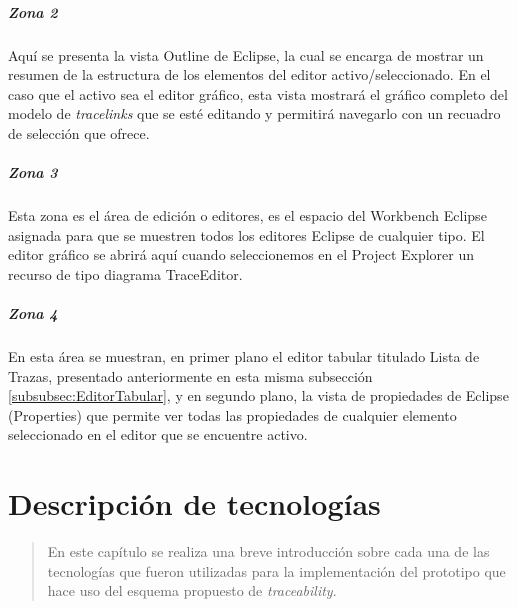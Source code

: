 \documentclass[a4paper,12pt,oneside,spanish]{book}
\begin{document}
\paragraph{Zona 2}
Aquí se presenta la vista \textsf{Outline} de \textsf{Eclipse}, la cual se encarga de mostrar un resumen de la estructura de los elementos del editor activo/seleccionado. En el caso que el activo sea el editor gráfico, esta vista mostrará el gráfico completo del modelo de \textit{tracelinks} que se esté editando y permitirá navegarlo con un recuadro de selección que ofrece.


\paragraph{Zona 3}
Esta zona es el área de edición o editores, es el espacio del Workbench \textsf{Eclipse} asignada para que se muestren todos los editores \textsf{Eclipse} de cualquier tipo. El editor gráfico se abrirá aquí cuando seleccionemos en el \textsf{Project Explorer} un recurso de tipo diagrama \textsf{TraceEditor}.


\paragraph{Zona 4}
En esta área se muestran, en primer plano el editor tabular titulado \textsf{Lista de Trazas}, presentado anteriormente en esta misma subsección \ref{subsubsec:EditorTabular}, y en segundo plano, la vista de propiedades de \textsf{Eclipse} (\textsf{Properties}) que permite ver todas las propiedades de cualquier elemento seleccionado en el editor que se encuentre activo.




\chapter{Descripción de tecnologías}

\begin{quotation}
En este capítulo se realiza una breve introducción sobre cada una de las tecnologías que fueron utilizadas para la implementación del prototipo que hace uso del esquema propuesto de \textit{traceability}.
\end{quotation}


\bigskip


\minitoc 


\pagebreak
\end{document}
